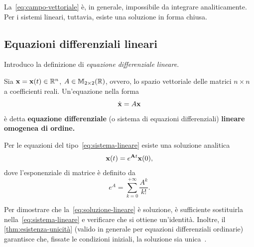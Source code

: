 La~\eqref{eq:campo-vettoriale} è, in generale, impossibile da integrare analiticamente.
Per i sistemi lineari, tuttavia, esiste una soluzione in forma chiusa.

\subsection{Equazioni differenziali lineari}
\label{subsec:equazioni-differenziali-lineari}
Introduco la definizione di \emph{equazione differenziale lineare}.
\begin{definition}
    Sia $\mathbf{x} = \mathbf{x}(t) \in \mathbb{R}^n$, $A \in \mathbb{M}_{2\times 2}(\mathbb{R})$, ovvero, lo spazio vettoriale delle
    matrici $n \times n$ a coefficienti reali. Un'equazione nella forma
    \begin{equation}
        \dot{\mathbf{x}} = A \mathbf{x}
        \label{eq:sistema-lineare}
    \end{equation}
    è detta \textbf{equazione differenziale} (o sistema di equazioni differenziali) \textbf{lineare omogenea di  ordine.}
    \label{def:sistema-lineare}
\end{definition}

Per le equazioni del tipo~\eqref{eq:sistema-lineare} esiste una soluzione analitica
\begin{equation}
    \mathbf{x}(t) = e^{\mathbf{A} t} \mathbf{x}(0),
    \label{eq:soluzione-lineare}
\end{equation}
dove l'esponenziale di matrice è definito da
\begin{equation*}
    e^{A} = \sum_{k=0}^{+\infty} \frac{A^k}{k!}.
\end{equation*}

Per dimostrare che la~\eqref{eq:soluzione-lineare} è soluzione, è
sufficiente sostituirla nella~\eqref{eq:sistema-lineare} e verificare che
si ottiene un'identità.
Inoltre, il \autoref{thm:esistenza-unicità} (valido in generale per equazioni
differenziali ordinarie) garantisce che,
fissate le condizioni iniziali, la
soluzione sia unica~\cite{De_Marco_1999}.

